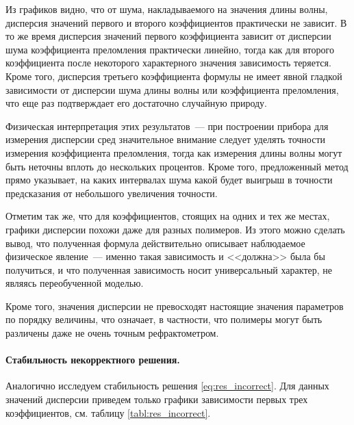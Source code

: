 \documentclass[12pt,a4paper]{article}
\theoremstyle{definition}
\begin{document}
Из графиков видно, что от шума, накладываемого на значения длины волны, дисперсия значений
первого и второго коэффициентов практически не зависит. В то же время дисперсия значений
первого коэффициента зависит от дисперсии шума коэффициента преломления практически линейно,
тогда как для второго коэффициента после некоторого характерного значения зависимость теряется.
Кроме того, дисперсия третьего коэффициента формулы не имеет явной гладкой зависимости от
дисперсии шума длины волны или коэффициента преломления, что еще раз подтверждает его достаточно
случайную природу.

Физическая интерпретация этих результатов~--- при построении прибора для измерения дисперсии
сред значительное внимание следует уделять точности измерения коэффициента преломления,
тогда как измерения длины волны могут быть неточны вплоть до нескольких процентов. Кроме того,
предложенный метод прямо указывает, на каких интервалах шума какой будет выигрыш в точности
предсказания от небольшого увеличения точности.

Отметим так же, что для коэффициентов, стоящих на одних и тех же местах, графики дисперсии
похожи даже для разных полимеров. Из этого можно сделать вывод, что полученная формула
действительно описывает наблюдаемое физическое явление~--- именно такая зависимость и
<<должна>> была бы получиться, и что полученная зависимость носит универсальный характер,
не являясь переобученной моделью.

Кроме того, значения дисперсии не превосходят настоящие значения параметров по порядку величины,
что означает, в частности, что полимеры могут быть различены даже не очень точным рефрактометром.

\paragraph{Стабильность некорректного решения.}

Аналогично исследуем стабильность решения \eqref{eq:res_incorrect}. Для данных значений дисперсии
приведем только графики зависимости первых трех коэффициентов, см. таблицу \ref{tabl:res_incorrect}.
\end{document}

